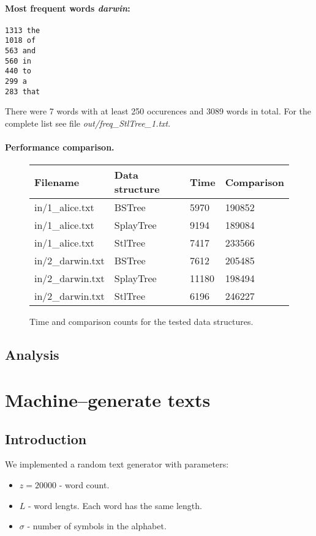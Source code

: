 \documentclass[12pt,a4paper]{article}
\begin{document}
\paragraph{Most frequent words \emph{darwin}:}
\begin{lstlisting}
1313 the
1018 of
563 and
560 in
440 to
299 a
283 that
\end{lstlisting}
There were 7 words with at least 250 occurences and 3089 words in total. 
For the complete list see file \emph{out/freq\_StlTree\_1.txt}. 

\paragraph{Performance comparison.} 
\begin{figure}[h]
  \centering
\begin{tabular}{|l|l|l|l|}
\hline
Filename&Data structure&Time&Comparison\\
\hline
in/1\_alice.txt&BSTree&5970&190852\\
\hline
in/1\_alice.txt&SplayTree&9194&189084\\
\hline
in/1\_alice.txt&StlTree&7417&233566\\
\hline
in/2\_darwin.txt&BSTree&7612&205485\\
\hline
in/2\_darwin.txt&SplayTree&11180&198494\\
\hline
in/2\_darwin.txt&StlTree&6196&246227\\
\hline
\end{tabular}
  \caption{Time and comparison counts for the tested data structures.}
  \label{fig:main_time_cmp}
\end{figure}

\subsection{Analysis} 

\section{Machine--generate texts} 
\subsection{Introduction} 

We implemented a random text generator with parameters: 
\begin{itemize}
\item $z = 20000$ - word count. 
\item $L$ - word lengts. Each word has the same length. 
\item $\sigma$ - number of symbols in the alphabet. 
\end{itemize}
\end{document}
